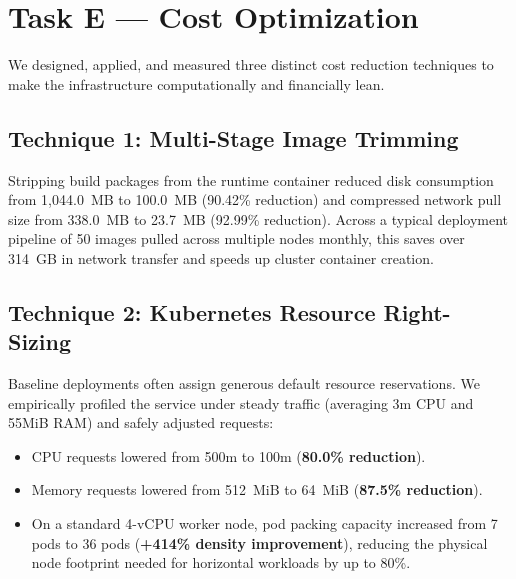 \documentclass[conference]{IEEEtran}
\begin{document}
\begin{table}[htbp]
\centering
\caption{Disaster Recovery Failover Latency Benchmarks}
\label{tab:failover_eval}
\end{table}

\section{Task E --- Cost Optimization}

We designed, applied, and measured three distinct cost reduction techniques to make the infrastructure computationally and financially lean.

\subsection{Technique 1: Multi-Stage Image Trimming}
Stripping build packages from the runtime container reduced disk consumption from 1,044.0~MB to 100.0~MB (90.42\% reduction) and compressed network pull size from 338.0~MB to 23.7~MB (92.99\% reduction). Across a typical deployment pipeline of 50 images pulled across multiple nodes monthly, this saves over 314~GB in network transfer and speeds up cluster container creation.

\subsection{Technique 2: Kubernetes Resource Right-Sizing}
Baseline deployments often assign generous default resource reservations. We empirically profiled the service under steady traffic (averaging 3m CPU and 55MiB RAM) and safely adjusted requests:
\begin{itemize}
    \item CPU requests lowered from 500m to 100m (\textbf{80.0\% reduction}).
    \item Memory requests lowered from 512~MiB to 64~MiB (\textbf{87.5\% reduction}).
    \item On a standard 4-vCPU worker node, pod packing capacity increased from 7 pods to 36 pods (\textbf{+414\% density improvement}), reducing the physical node footprint needed for horizontal workloads by up to 80\%.
\end{itemize}
\end{document}
